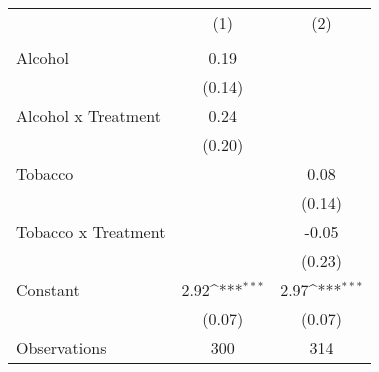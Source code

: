 {
\def\sym#1{\ifmmode^{#1}\else\(^{#1}\)\fi}
\begin{tabular}{l*{2}{c}}
\toprule
                &&\\
                &&\\
\midrule
Alcohol         &     0.19         &                  \\
                &   (0.14)         &                  \\
\addlinespace
Alcohol x Treatment&     0.24         &                  \\
                &   (0.20)         &                  \\
\addlinespace
Tobacco         &                  &     0.08         \\
                &                  &   (0.14)         \\
\addlinespace
Tobacco x Treatment&                  &    -0.05         \\
                &                  &   (0.23)         \\
\addlinespace
Constant        &     2.92\sym{***}&     2.97\sym{***}\\
                &   (0.07)         &   (0.07)         \\
\midrule
Observations    &      300         &      314         \\
\bottomrule
\end{tabular}
}

